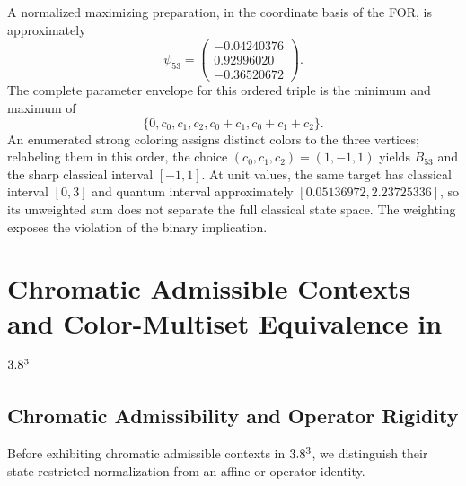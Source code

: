 \documentclass[aps,pra,reprint,superscriptaddress,longbibliography,nofootinbib,floatfix,10pt]{revtex4-2}
\theoremstyle{definition}\newtheorem{definition}[theorem]{Definition}
\theoremstyle{remark}\newtheorem{remark}[theorem]{Remark}
\begin{document}
A normalized maximizing preparation, in the coordinate basis of the FOR, is approximately
\begin{equation}\label{eq:H53-weighted-facet-state}
\psi_{53}=\begin{pmatrix}-0.04240376\\0.92996020\\-0.36520672\end{pmatrix}.
\end{equation}
The complete parameter envelope for this ordered triple is the minimum and maximum of
\begin{equation}\label{eq:H53-weighted-facet-envelope}
\{0,c_0,c_1,c_2,c_0+c_1,c_0+c_1+c_2\}.
\end{equation}
An enumerated strong coloring assigns distinct colors to the three vertices; relabeling them in this order, the choice $(c_0,c_1,c_2)=(1,-1,1)$ yields $B_{53}$ and the sharp classical interval $[-1,1]$. At unit values, the same target has classical interval $[0,3]$ and quantum interval approximately $[0.05136972,2.23725336]$, so its unweighted sum does not separate the full classical state space. The weighting exposes the violation of the binary implication.

\section{Chromatic Admissible Contexts and Color-Multiset Equivalence in \texorpdfstring{$3.8^3$}{R3}}\label{sec:complete-rainbow}

\subsection{Chromatic Admissibility and Operator Rigidity}\label{sec:no-go-operator}

Before exhibiting chromatic admissible contexts in $3.8^3$, we distinguish their state-restricted normalization from an affine or operator identity.
\end{document}
